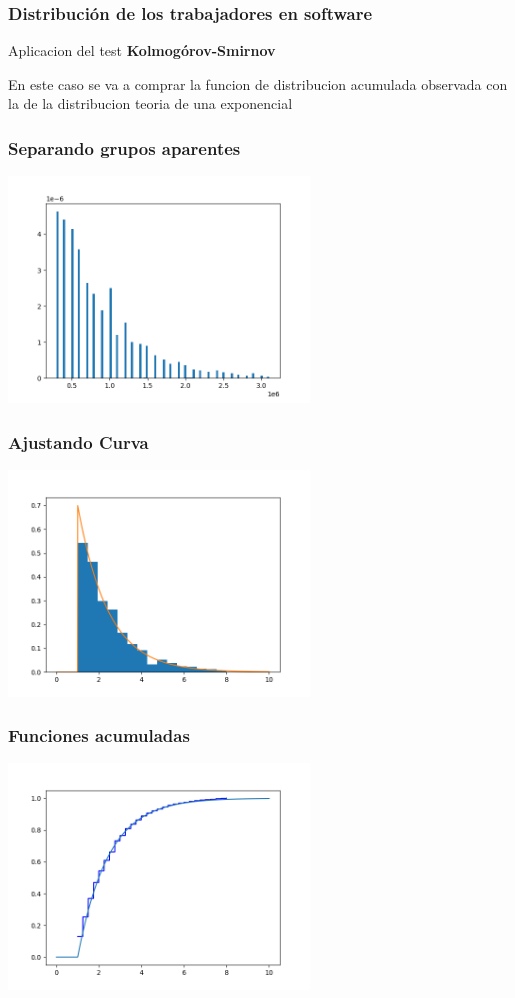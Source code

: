 \documentclass{beamer}
\begin{document}
\begin{frame}
  \frametitle{Distribución de los trabajadores en software}
  \alert{Aplicacion del test \textbf{Kolmogórov-Smirnov}}

  En este caso se va a comprar la funcion de distribucion acumulada observada
  con la de la distribucion teoria de una exponencial

\end{frame}

\begin{frame}
  \frametitle{Separando grupos aparentes}
  \includegraphics[width=8cm]{procesado.png}
  
\end{frame}

\begin{frame}
  \frametitle{Ajustando Curva}
  \includegraphics[width=8cm]{hip2/ajustando_curva.png}
  
\end{frame}

\begin{frame}
  \frametitle{Funciones acumuladas}
  \includegraphics[width=8cm]{hip2/acumuladas.png}
  
\end{frame}
\end{document}
